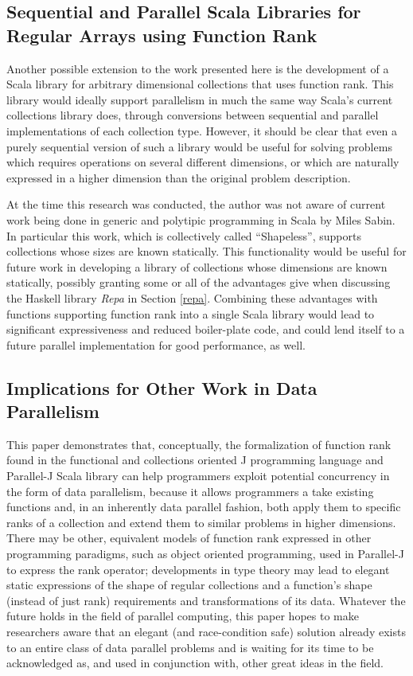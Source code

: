 \subsection{Sequential and Parallel Scala Libraries for Regular Arrays using Function Rank}
Another possible extension to the work presented here 
is the development of a Scala library for arbitrary dimensional collections that uses function rank. 
This library would ideally support parallelism in much the same way 
Scala's current collections library does\cite{pc},
through conversions between sequential and parallel implementations of each collection type. 
However, it should be clear that even 
a purely sequential version of such a library would be useful 
for solving problems which requires operations on several different dimensions, 
or which are naturally expressed in a higher dimension than the original problem description.

At the time this research was conducted, 
the author was not aware of current work being done in 
generic and polytipic programming in Scala by Miles Sabin. 
In particular this work, which is collectively called ``Shapeless''\cite{shapeless}, 
supports collections whose sizes are known statically. 
This functionality would be useful for future work in developing 
a library of collections whose dimensions are known statically, 
possibly granting some or all of the advantages give when discussing 
the Haskell library \textit{Repa} in Section \ref{repa}\cite{dph}.
Combining these advantages with functions supporting function rank into a single Scala library
would lead to significant expressiveness and reduced boiler-plate code, 
and could lend itself to a future parallel implementation for good performance, as well.

\subsection{Implications for Other Work in Data Parallelism}
This paper demonstrates that, conceptually, 
the formalization of function rank found in the functional and collections oriented 
J programming language and Parallel-J Scala library 
can help programmers exploit potential concurrency in the form of data parallelism, 
because it allows programmers a take existing functions and, in an inherently data parallel fashion, 
both apply them to specific ranks of a collection and 
extend them to similar problems in higher dimensions. 
There may be other, equivalent models of function rank expressed in other programming paradigms, 
such as object oriented programming, used in Parallel-J to express the rank operator; 
developments in type theory may lead to elegant static expressions of 
the shape of regular collections and a function's shape (instead of just rank) requirements and transformations of its data. 
Whatever the future holds in the field of parallel computing, 
this paper hopes to make researchers aware that an elegant (and race-condition safe) solution 
already exists to an entire class of data parallel problems 
and is waiting for its time to be acknowledged as, and used in conjunction with, other great ideas in the field.
